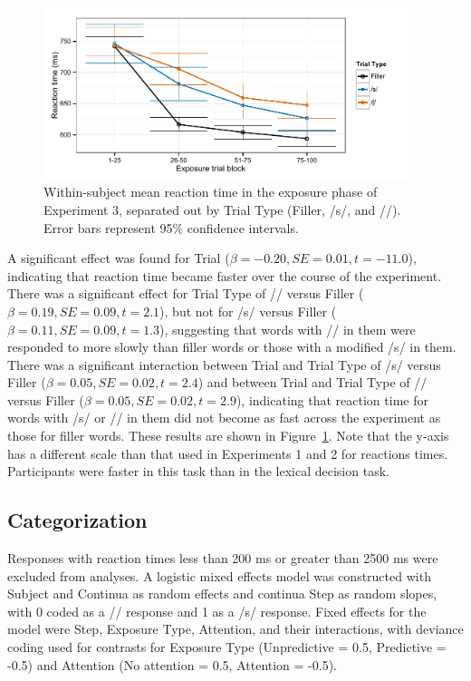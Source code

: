 \begin{figure}[!ht]
\centering
\caption{Within-subject mean reaction time in the exposure phase of Experiment 3, separated out by Trial Type (Filler, /s/, and /\textesh/). Error bars represent 95\% confidence intervals.}
\label{fig:exp3exposert}
\begin{center}
\includegraphics[width=0.95\textwidth]{graphs/exp3_exprt}
\end{center}
\end{figure}

A significant effect was found for Trial ($\beta = -0.20, SE = 0.01, t = -11.0$), indicating that reaction time became faster over the course of the experiment.
There was a significant effect for Trial Type of /\textesh/ versus Filler ($\beta = 0.19, SE = 0.09, t = 2.1$), but not for /s/ versus Filler ($\beta = 0.11, SE = 0.09, t = 1.3$), suggesting that words with /\textesh/ in them were responded to more slowly than filler words or those with a modified /s/ in them.
There was a significant interaction between Trial and Trial Type of  /s/ versus Filler ($\beta = 0.05, SE = 0.02, t = 2.4$) and between Trial and Trial Type of /\textesh/ versus Filler ($\beta = 0.05, SE = 0.02, t = 2.9$), indicating that reaction time for words with /s/ or /\textesh/ in them did not become as fast across the experiment as those for filler words.
These results are shown in Figure~\ref{fig:exp3exposert}.
Note that the y-axis has a different scale than that used in Experiments 1 and 2 for reactions times.
Participants were faster in this task than in the lexical decision task.


\subsection{Categorization}

Responses with reaction times less than 200 ms or greater than 2500 ms were excluded from analyses. 
A logistic mixed effects model was constructed with Subject and Continua as random effects and continua Step as random slopes, with 0 coded as a /\textesh/ response and 1 as a /s/ response.  Fixed effects for the model were Step, Exposure Type, Attention, and their interactions, with deviance coding used for contrasts for Exposure Type (Unpredictive = 0.5, Predictive = -0.5) and Attention (No attention = 0.5, Attention = -0.5).


